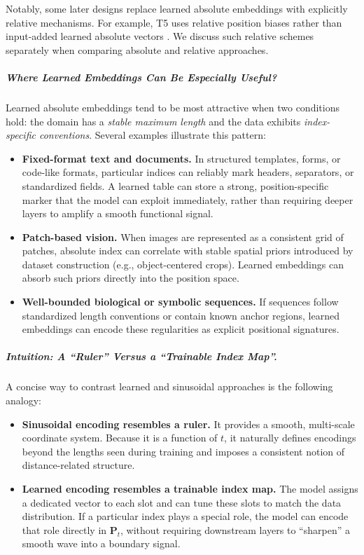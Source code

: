 \noindent
Notably, some later designs replace learned absolute embeddings with explicitly relative mechanisms.
For example, T5 uses relative position biases rather than input-added learned absolute vectors \cite{raffel2020_t5}.
We discuss such relative schemes separately when comparing absolute and relative approaches.

\subparagraph{Where Learned Embeddings Can Be Especially Useful?}
\noindent
Learned absolute embeddings tend to be most attractive when two conditions hold:
the domain has a \emph{stable maximum length} and the data exhibits \emph{index-specific conventions}.
Several examples illustrate this pattern:
\begin{itemize}
	\item \textbf{Fixed-format text and documents.}
	In structured templates, forms, or code-like formats, particular indices can reliably mark headers, separators, or standardized fields.
	A learned table can store a strong, position-specific marker that the model can exploit immediately, rather than requiring deeper layers to amplify a smooth functional signal.
	
	\item \textbf{Patch-based vision.}
	When images are represented as a consistent grid of patches, absolute index can correlate with stable spatial priors introduced by dataset construction (e.g., object-centered crops).
	Learned embeddings can absorb such priors directly into the position space.
	
	\item \textbf{Well-bounded biological or symbolic sequences.}
	If sequences follow standardized length conventions or contain known anchor regions,
	learned embeddings can encode these regularities as explicit positional signatures.
\end{itemize}

\subparagraph{Intuition: A ``Ruler'' Versus a ``Trainable Index Map''.}
\noindent
A concise way to contrast learned and sinusoidal approaches is the following analogy:
\begin{itemize}
	\item \textbf{Sinusoidal encoding resembles a ruler.}
	It provides a smooth, multi-scale coordinate system.
	Because it is a function of \(t\), it naturally defines encodings beyond the lengths seen during training and imposes a consistent notion of distance-related structure.
	
	\item \textbf{Learned encoding resembles a trainable index map.}
	The model assigns a dedicated vector to each slot and can tune these slots to match the data distribution.
	If a particular index plays a special role, the model can encode that role directly in \(\mathbf{P}_t\), without requiring downstream layers to ``sharpen'' a smooth wave into a boundary signal.
\end{itemize}

